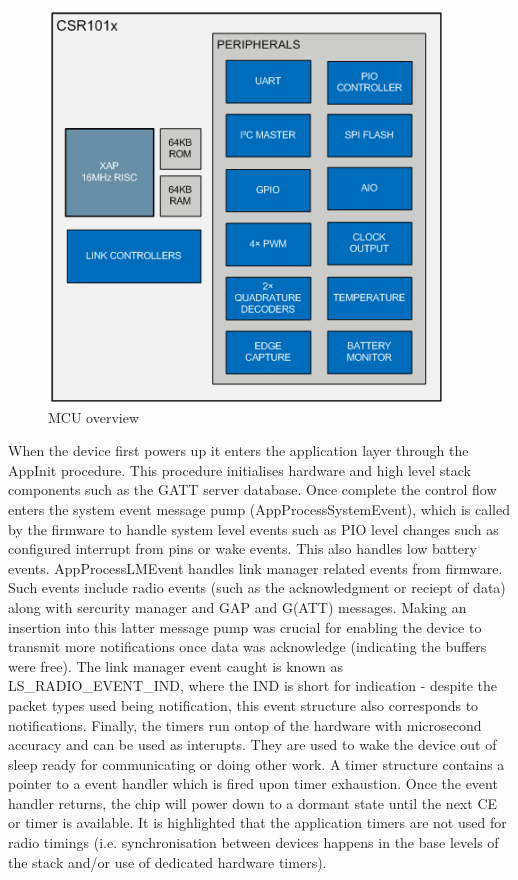\documentclass[]{article}
\begin{document}
\begin{figure}[htb]
	\begin{center}
		\includegraphics{mcu}
	\end{center}
	\caption{MCU overview \cite{firmwaredev}}
	\label{fig:mcu}
\end{figure}

When the device first powers up it enters the application layer through the AppInit procedure. This procedure initialises hardware and high level stack components such as the GATT server database. Once complete the control flow enters the system event message pump (AppProcessSystemEvent), which is called by the firmware to handle system level events such as PIO level changes such as configured interrupt from pins or wake events. This also handles low battery events. AppProcessLMEvent handles link manager related events from firmware. Such events include radio events (such as the acknowledgment or reciept of data) along with sercurity manager and GAP and G(ATT) messages. Making an insertion into this latter message pump was crucial for enabling the device to transmit more notifications once data was acknowledge (indicating the buffers were free). The link manager event caught is known as LS\_RADIO\_EVENT\_IND, where the IND is short for indication - despite the packet types used being notification, this event structure also corresponds to notifications. Finally, the timers run ontop of the hardware with microsecond accuracy and can be used as interupts. They are used to wake the device out of sleep ready for communicating or doing other work. A timer structure contains a pointer to a event handler which is fired upon timer exhaustion. Once the event handler returns, the chip will power down to a dormant state until the next \ac{CE} or timer is available. It is highlighted that the application timers are not used for radio timings (i.e. synchronisation between devices happens in the base levels of the stack and/or use of dedicated hardware timers).
\end{document}
